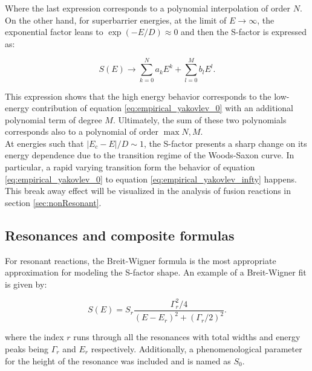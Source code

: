 \documentclass[openany]{book}
\begin{document}
Where the last expression corresponds to a polynomial interpolation of order $N$. On the other hand, for superbarrier energies, at the limit of $E \rightarrow \infty $, the exponential factor leans to $\exp {(-E/D)} \approx 0$ and then the S-factor is expressed as: 


\begin{equation} \label{eq:empirical_yakovlev_infty}
	S(E) \rightarrow \sum_{k=0}^{N} {a_kE^k} + \sum_{l=0}^{M} {b_lE^l}.
\end{equation}

This expression shows that the high energy behavior corresponds to the low-energy contribution of equation \ref{eq:empirical_yakovlev_0} with an additional polynomial term of degree $M$. Ultimately, the sum of these two polynomials corresponds also to a polynomial of order $\max{N, M}$. \\

At energies such that $|E_c - E|/D \sim 1$, the S-factor presents a sharp change on its energy dependence due to the transition regime of the Woods-Saxon curve. In particular, a rapid varying transition form the behavior of equation \ref{eq:empirical_yakovlev_0} to equation  \ref{eq:empirical_yakovlev_infty} happens. This break away effect will be visualized in the analysis of fusion reactions in section \ref{sec:nonResonant}. 
 
\subsection{Resonances and composite formulas} \label{sub:empirical_resonances}


For resonant reactions, the Breit-Wigner formula is the most appropriate approximation for modeling the S-factor shape. An example of a Breit-Wigner fit is given by: 

\begin{equation} \label{eq:empirical_breitWigner}
	S(E) = S_r \frac{\Gamma^2_r/4}{(E-E_r)^2 + (\Gamma_r/2)^2}.
\end{equation}

where the index $r$ runs through all the resonances with total widths and energy peaks being $\Gamma_r$ and $E_r$ respectively. Additionally, a phenomenological parameter for the height of the resonance was included and is named as $S_0$. \\
\end{document}
